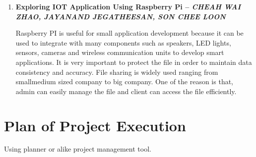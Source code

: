 \documentclass[16pt,oneside,a4paper]{article}
\begin{document}
\begin{enumerate}
\pagebreak

\item \textbf{Exploring IOT Application Using Raspberry Pi -- \textit{CHEAH WAI ZHAO, JAYANAND JEGATHEESAN, SON CHEE LOON}}

Raspberry PI is useful for small application development because it can be used to integrate with many components such as speakers, LED lights, sensors, cameras and wireless communication units to develop smart applications. It is very important to protect the file in order to maintain data consistency and accuracy. File sharing is widely used ranging from smallmedium sized company to big company. One of the reason is that, admin can easily manage the file and client can access the file efficiently.\\


\end{enumerate}

\section{Plan of Project Execution}
  Using planner or alike project management tool.
\end{document}
